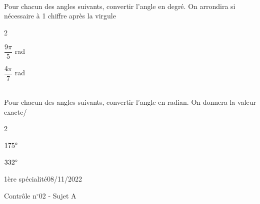 \documentclass[a4paper,12pt]{article}        %
\begin{document}
\\
Pour chacun des angles suivants, convertir l'angle en degré. On arrondira si nécessaire à 1 chiffre après la virgule
\begin{multicols}{2}
\begin{enumMet}
    \item $\dfrac{9\pi}{5}$ rad
    \item $\dfrac{4\pi}{7}$ rad
\end{enumMet}
\end{multicols}

\\
Pour chacun des angles suivants, convertir l'angle en radian. On donnera la valeur exacte/
\begin{multicols}{2}
\begin{enumMet}
    \item $175\degree$
    \item $332\degree$
\end{enumMet}
\end{multicols}

\newpage

\vspace*{-1.5cm}
1ère spécialité\phantom{xxxxxxxxxxxxxxxxxxxxxxxxxxxxxxxxxxxxxxxxxxxxxxxxxxxxxxxxxxxxxxx}08/11/2022
{\begin{center}\Huge{Contrôle n$^{\circ}$02 - Sujet A}\end{center}}

\end{document}

